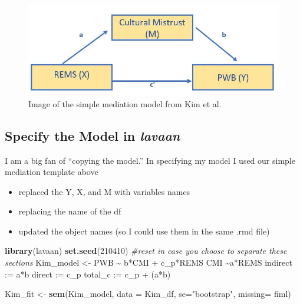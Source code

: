 \documentclass[
  11pt,
]{book}
\newenvironment{Shaded}{\begin{snugshade}}{\end{snugshade}}
\newcommand{\AttributeTok}[1]{\textcolor[rgb]{0.27,0.27,0.27}{#1}}
\newcommand{\CommentTok}[1]{\textcolor[rgb]{0.37,0.37,0.37}{\textit{#1}}}
\newcommand{\DecValTok}[1]{\textcolor[rgb]{0.06,0.06,0.06}{#1}}
\newcommand{\FunctionTok}[1]{\textcolor[rgb]{0.27,0.27,0.27}{\textbf{#1}}}
\newcommand{\NormalTok}[1]{#1}
\newcommand{\OtherTok}[1]{\textcolor[rgb]{0.37,0.37,0.37}{#1}}
\newcommand{\StringTok}[1]{\textcolor[rgb]{0.5,0.5,0.5}{#1}}
\providecommand{\tightlist}{%
  \setlength{\itemsep}{0pt}\setlength{\parskip}{0pt}}
\begin{document}
\begin{figure}
\centering
\includegraphics{images/SimpleMed/Kim_SimpMed.jpg}
\caption{Image of the simple mediation model from Kim et al.}
\end{figure}

\hypertarget{specify-the-model-in-lavaan}{%
\subsection{\texorpdfstring{Specify the Model in \emph{lavaan}}{Specify the Model in lavaan}}\label{specify-the-model-in-lavaan}}

I am a big fan of ``copying the model.'' In specifying my model I used our simple mediation template above

\begin{itemize}
\tightlist
\item
  replaced the Y, X, and M with variables names
\item
  replacing the name of the df
\item
  updated the object names (so I could use them in the same .rmd file)
\end{itemize}

\begin{Shaded}
\begin{Highlighting}[]
\FunctionTok{library}\NormalTok{(lavaan)}
\FunctionTok{set.seed}\NormalTok{(}\DecValTok{210410}\NormalTok{) }\CommentTok{\#reset in case you choose to separate these sections}
\NormalTok{Kim\_model }\OtherTok{\textless{}{-}} \StringTok{\textquotesingle{}}
\StringTok{          PWB \textasciitilde{} b*CMI + c\_p*REMS }
\StringTok{          CMI \textasciitilde{}a*REMS}
\StringTok{          }
\StringTok{          indirect :=  a*b}
\StringTok{          direct  := c\_p}
\StringTok{          total\_c  := c\_p + (a*b)}
\StringTok{          \textquotesingle{}}
\end{Highlighting}
\end{Shaded}

\begin{Shaded}
\begin{Highlighting}[]
\NormalTok{Kim\_fit }\OtherTok{\textless{}{-}} \FunctionTok{sem}\NormalTok{(Kim\_model, }\AttributeTok{data =}\NormalTok{ Kim\_df, }\AttributeTok{se=}\StringTok{"bootstrap"}\NormalTok{, }\AttributeTok{missing=} \StringTok{\textquotesingle{}fiml\textquotesingle{}}\NormalTok{)}
\end{Highlighting}
\end{Shaded}
\end{document}
